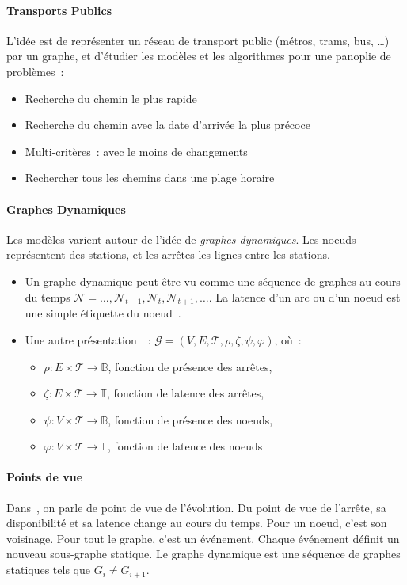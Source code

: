 \documentclass[12pt,a4paper]{article}
\begin{document}
\paragraph{Transports Publics}
L'idée est de représenter un réseau de transport public (métros,
trams, bus, …) par un graphe, et d'étudier les modèles et les
algorithmes pour une panoplie de problèmes~:
\begin{itemize}
\item Recherche du chemin le plus rapide
\item Recherche du chemin avec la date d'arrivée la plus précoce
\item Multi-critères~: avec le moins de changements
\item Rechercher tous les chemins dans une plage horaire
\end{itemize}


\paragraph{Graphes Dynamiques}
Les modèles varient autour de l'idée de \textit{graphes
  dynamiques}. Les noeuds représentent des stations, et les arrêtes
les lignes entre les stations.

\begin{itemize}
\item Un graphe dynamique peut être vu comme une séquence de graphes
  au cours du temps \(\mathcal{N} = \dots, \mathcal{N}_{t-1},
  \mathcal{N}_{t}, \mathcal{N}_{t+1}, \dots\). La latence d'un arc ou
  d'un noeud est une simple étiquette du noeud~\cite{xuan2003computing}.
\item Une autre présentation~\cite{casteigts2012time}~:
  \(\mathcal{G} = (V, E, \mathcal{T}, \rho, \zeta, \psi, \varphi)\),
  où~:
  \begin{itemize}
  \item \(\rho : E \times \mathcal{T} \to \mathbb{B}\), fonction de
    présence des arrêtes,
  \item \(\zeta : E \times \mathcal{T} \to \mathbb{T}\), fonction de
    latence des arrêtes,
  \item \(\psi : V \times \mathcal{T} \to \mathbb{B}\), fonction de
    présence des noeuds,
  \item \(\varphi : V \times \mathcal{T} \to \mathbb{T}\), fonction de
    latence des noeuds
  \end{itemize}
\end{itemize}

\paragraph{Points de vue}
Dans~\cite{casteigts2012time}, on parle de point de vue de
l'évolution. Du point de vue de l'arrête, sa disponibilité et sa
latence change au cours du temps. Pour un noeud, c'est son voisinage.
Pour tout le graphe, c'est un événement. Chaque événement définit un
nouveau sous-graphe statique. Le graphe dynamique est une séquence de
graphes statiques tels que \(G_i \neq G_{i+1}\).
\end{document}
